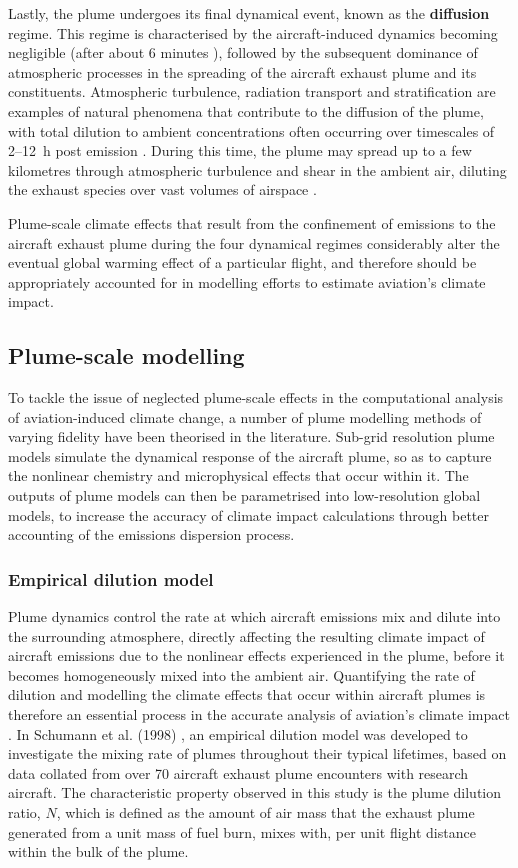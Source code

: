 Lastly, the plume undergoes its final dynamical event, known as the \textbf{diffusion} regime. This regime is characterised by the aircraft-induced dynamics becoming negligible (after about 6 minutes \cite{Unterstrasser2014}), followed by the subsequent dominance of atmospheric processes in the spreading of the aircraft exhaust plume and its constituents. Atmospheric turbulence, radiation transport and stratification are examples of natural phenomena that contribute to the diffusion of the plume, with total dilution to ambient concentrations often occurring over timescales of 2--12~h post emission \cite{EPA1992}. During this time, the plume may spread up to a few kilometres through atmospheric turbulence and shear in the ambient air, diluting the exhaust species over vast volumes of airspace \cite{Schumann1995}.

Plume-scale climate effects that result from the confinement of emissions to the aircraft exhaust plume during the four dynamical regimes considerably alter the eventual global warming effect of a particular flight, and therefore should be appropriately accounted for in modelling efforts to estimate aviation's climate impact.

\subsection{Plume-scale modelling}
To tackle the issue of neglected plume-scale effects in the computational analysis of aviation-induced climate change, a number of plume modelling methods of varying fidelity have been theorised in the literature. Sub-grid resolution plume models simulate the dynamical response of the aircraft plume, so as to capture the nonlinear chemistry and microphysical effects that occur within it. The outputs of plume models can then be parametrised into low-resolution global models, to increase the accuracy of climate impact calculations through better accounting of the emissions dispersion process. 

\subsubsection{Empirical dilution model}
Plume dynamics control the rate at which aircraft emissions mix and dilute into the surrounding atmosphere, directly affecting the resulting climate impact of aircraft emissions due to the nonlinear effects experienced in the plume, before it becomes homogeneously mixed into the ambient air. Quantifying the rate of dilution and modelling the climate effects that occur within aircraft plumes is therefore an essential process in the accurate analysis of aviation's climate impact \cite{Schumann1995}. In Schumann et al. (1998) \cite{Schumann1998}, an empirical dilution model was developed to investigate the mixing rate of plumes throughout their typical lifetimes, based on data collated from over 70 aircraft exhaust plume encounters with research aircraft. The characteristic property observed in this study is the plume dilution ratio, $N$, which is defined as the amount of air mass that the exhaust plume generated from a unit mass of fuel burn, mixes with, per unit flight distance within the bulk of the plume. 

